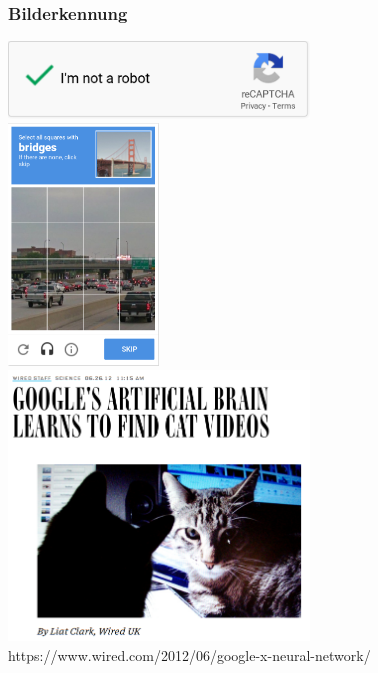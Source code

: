 \documentclass[12pt]{beamer}
\begin{document}
\begin{frame}
  \frametitle{Bilderkennung}
  \pause
  \begin{center}
     {
      \includegraphics[width=0.6\textwidth]{img/recaptcha_1.png} \\
    }
     {
      \includegraphics[width=0.3\textwidth]{img/recaptcha_2.png} \\
    }
     {
      \includegraphics[width=0.6\textwidth]{img/cat_videos.png} \\
      \tiny https://www.wired.com/2012/06/google-x-neural-network/
    }
  \end{center}
\end{frame}
\end{document}
